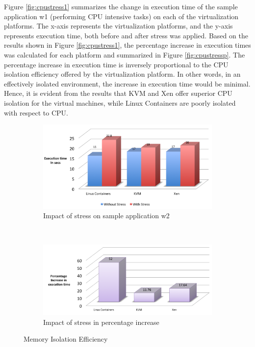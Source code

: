 Figure \ref{fig:cpustress1} summarizes the change in execution time of the sample application w1 (performing CPU intensive tasks) on each of the virtualization platforms. The x-axis represents the virtualization platforms, and the y-axis represents execution time, both before and after stress was applied. Based on the results shown in Figure \ref{fig:cpustress1}, the percentage increase in execution times was calculated for each platform and summarized in Figure \ref{fig:cpustressp}. The percentage increase in execution time is inversely proportional to the CPU isolation efficiency offered by the virtualization platform. In other words, in an effectively isolated environment, the increase in execution time would be minimal. Hence, it is evident from the results that KVM and Xen offer superior CPU isolation for the virtual machines, while Linux Containers are poorly isolated with respect to CPU.

\begin{figure}[H]
        \centering
        \begin{subfigure}[b]{0.99\textwidth}
                \includegraphics[width=\textwidth]{memstress.png}
                \caption{Impact of stress on sample application w2}
                \label{fig:memstress1}
        \end{subfigure}%
        ~ %
        \qquad \newline %
        \begin{subfigure}[b]{0.8\textwidth}
                \includegraphics[width=\textwidth]{memstressp.png}
                \caption{Impact of stress in percentage increase}
                \label{fig:memstressp}
        \end{subfigure}
        \caption{Memory Isolation Efficiency}\label{fig:memisolation}
\end{figure}

